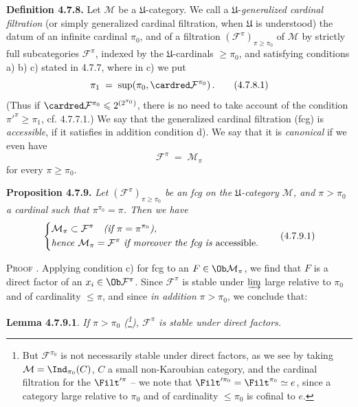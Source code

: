 \textbf{Definition 4.7.8.} Let $\mathcal{M}$ be a $\mathfrak{U}$-category. We call a $\mathfrak{U}$-\textit{generalized cardinal filtration} (or simply generalized cardinal filtration, when $\mathfrak{U}$ is understood) the datum of an infinite cardinal $\pi_0$, and of a filtration $(\mathcal{F}^{\pi})_{\pi\geqslant\pi_0}$ of $\mathcal{M}$ by strictly full subcategories $\mathcal{F}^{\pi}$, indexed by the $\mathfrak{U}$-cardinals $\geqslant\pi_0$, and satisfying conditions a) b) c) stated in 4.7.7, where in c) we put
\[
\pi_1 \;=\; \sup(\pi_0,\cardred\mathcal{F}^{\pi_0}) \, . \tag*{(4.7.8.1)}
\]
(Thus if $\cardred\mathcal{F}^{\pi_0}\leqslant 2^{(2^{\pi_0})}$, there is no need to take account of the condition $\pi'^{\pi}\geqslant\pi_1$, cf. 4.7.7.1.) We say that the generalized cardinal filtration (fcg) is \textit{accessible}, if it satisfies in addition condition d). We say that it is \textit{canonical} if we even have
\[
\mathcal{F}^{\pi} \;=\; \mathcal{M}_{\pi} \tag*{(4.7.8.2)}
\]
for every $\pi\geqslant\pi_0$.

\textbf{Proposition 4.7.9.} \textit{Let $(\mathcal{F}^{\pi})_{\pi\geqslant\pi_0}$ be an fcg on the $\mathfrak{U}$-category $\mathcal{M}$, and $\pi>\pi_0$ a cardinal such that $\pi^{\pi_0}=\pi$. Then we have}
\[
\left\{
\begin{aligned}
&\mathcal{M}_\pi\subset\mathcal{F}^{\pi}\quad\text{\textit{(if $\pi=\pi^{\pi_0}$),}}\\
&\text{\textit{hence} }\mathcal{M}_\pi=\mathcal{F}^{\pi}\text{ \textit{if moreover the fcg is} accessible.}
\end{aligned}
\right.
\tag*{(4.7.9.1)}
\]

\textsc{Proof} . Applying condition c) for fcg to an $F\in\Ob\mathcal{M}_\pi$, we find that $F$ is a direct factor of an $x_i\in\Ob\mathcal{F}^{\pi}$. Since $\mathcal{F}^{\pi}$ is stable under $\varinjlim$ large relative to $\pi_0$ and of cardinality $\leqslant\pi$, and since \textit{in addition} $\pi>\pi_0$, we conclude that:

\textbf{Lemma 4.7.9.1}. \textit{If $\pi>\pi_0$ (\footnote[76]{But $\mathcal{F}^{\pi_0}$ is not necessarily stable under direct factors, as we see by taking $\mathcal{M}=\Ind_{\pi_0}(C)$, $C$ a small non-Karoubian category, and the cardinal filtration for the $\Filt'^{\pi}$ -- we note that $\Filt'^{\pi_0}=\Filt^{\pi_0}\simeq e$, since a category large relative to $\pi_0$ and of cardinality $\leqslant\pi_0$ is cofinal to $e$.}), $\mathcal{F}^{\pi}$ is stable under direct factors.}


